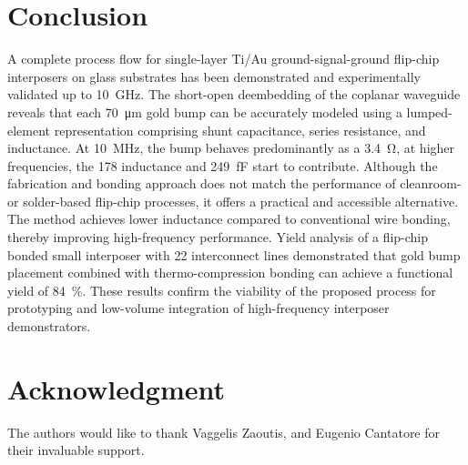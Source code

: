 \documentclass[conference]{IEEEtran}
\begin{document}
\section{Conclusion}
A complete process flow for single-layer Ti/Au ground-signal-ground flip-chip interposers on glass substrates has been demonstrated and experimentally validated up to \SI{10}{GHz}. The short-open deembedding of the coplanar waveguide reveals that each \SI{70}{\micro\metre} gold bump can be accurately modeled using a lumped-element representation comprising shunt capacitance, series resistance, and inductance. At \SI{10}{MHz}, the bump behaves predominantly as a \SI{3.4}{\ohm}, at higher frequencies, the \SI{178}{\pH} inductance and \SI{249}{\fF} start to contribute.
Although the fabrication and bonding approach does not match the performance of cleanroom- or solder-based flip-chip processes, it offers a practical and accessible alternative. The method achieves lower inductance compared to conventional wire bonding, thereby improving high-frequency performance.
Yield analysis of a flip-chip bonded small interposer with 22 interconnect lines demonstrated that gold bump placement combined with thermo-compression bonding can achieve a functional yield of \SI{84}{\percent}. These results confirm the viability of the proposed process for prototyping and low-volume integration of high-frequency interposer demonstrators.


\section*{Acknowledgment}
The authors would like to thank   Vaggelis Zaoutis, and Eugenio Cantatore for their invaluable support.



\end{document}
